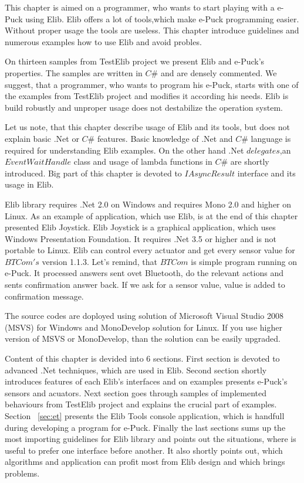 	This chapter is aimed on a programmer, who wants to start playing with a e-Puck using Elib. 
	Elib offers a lot of tools,which make e-Puck programming easier. 
	Without proper usage the tools are useless. This chapter introduce guidelines and numerous
	examples how to use Elib and avoid probles.
	
	On thirteen samples from TestElib project we present Elib and e-Puck's properties.
	The samples are written in $C\#$ and are densely commented.
	We suggest, that a programmer, who wants to program his e-Puck, starts with one of the examples
	from TestElib project and modifies it according his needs.
	Elib is build robustly and unproper usage does not destabilize the operation system.

	Let us note, that this chapter describe usage of Elib and its tools,
	but does not explain basic .Net or $C\#$ features. Basic knowledge of .Net and $C\#$ language is required
	for understanding Elib examples. On the other hand .Net $delegates$,an $EventWaitHandle$ class and usage of lambda functions in $C\#$
	are shortly introduced. Big part of this chapter is devoted to $IAsyncResult$ interface and its
	usage in Elib.

	Elib library requires .Net 2.0 on Windows and requires Mono 2.0%
	and higher on Linux.
	As an example of application, which use Elib, is at the end of this chapter presented Elib Joystick.
	Elib Joystick is a graphical application, which uses Windows Presentation Foundation. It requires .Net 3.5 or higher
	and is not portable to Linux.
	Elib can control every actuator and get every sensor value for $BTCom's$ version 1.1.3. Let's remind, that
	$BTCom$ is simple program running on e-Puck. It processed answers sent ovet Bluetooth, do the relevant actions
	and sents confirmation answer back. If we ask for a sensor value, value is added to confirmation message.

	The source codes are doployed using solution of Microsoft Visual Studio 2008 (MSVS) for Windows and MonoDevelop solution for Linux.
	If you use higher version of MSVS or MonoDevelop, than the solution can be easily upgraded.	

	Content of this chapter is devided into 6 sections.
	First section is devoted to advanced .Net techniques, which are used in Elib.
	Second section shortly introduces features of each Elib's interfaces and  on examples presents e-Puck's sensors and acuators.
	Next section goes through samples of implemented behaviours from TestElib project and explains the crucial part of examples.
	Section ~\ref{sec:et} presents the Elib Tools console application, which is handfull during developing a program for e-Puck.
	Finally the last sections sums up the most importing guidelines for Elib library and points out the situations,
	where is useful to prefer one interface before another. 
	It also shortly points out, which algorithms and application can profit most
	from Elib design and which brings problems.
	
